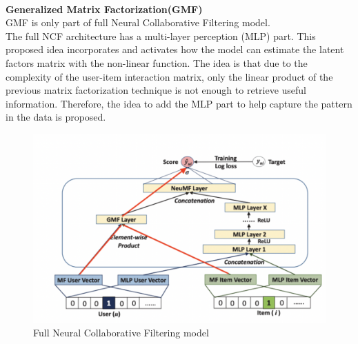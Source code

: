 \\\textbf{Generalized Matrix Factorization(GMF)}
 \\GMF is only part of full Neural Collaborative Filtering model.
 \\The full NCF architecture has a multi-layer perception (MLP) part. This proposed idea incorporates and activates how the model can estimate the latent factors matrix with the non-linear function. The idea is that due to the complexity of the user-item interaction matrix, only the linear product of the previous matrix factorization technique is not enough to retrieve useful information. Therefore, the idea to add the MLP part to help capture the pattern in the data is proposed.
 \begin{figure}[ht]
\centering
\includegraphics[scale = 0.5]{Figures/NCF}
\caption{Full Neural Collaborative Filtering model}
\end{figure}
 

